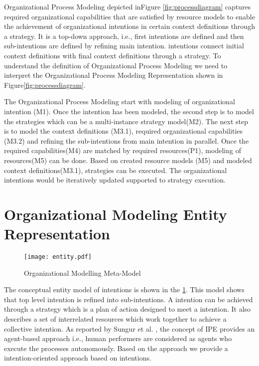 \hspace{4ex} Organizational Process Modeling depicted inFigure \ref{fig:processdiagram} captures required organizational capabilities that are satisfied by resource models  to enable the achievement of organizational intentions in certain context definitions through a strategy. It is a top-down approach, i.e., first intentions are defined and then sub-intentions  are defined by refining main intention. intentions connect initial context definitions with final context definitions through a strategy.  To understand the definition of Organizational Process Modeling we need to interpret the Organizational Process Modeling Representation shown in Figure\ref{fig:processdiagram}. 

\hspace{4ex} The Organizational Process Modeling start with modeling of organizational intention (M1). Once the intention has been modeled, the second step is to model the strategies which can be a multi-instance strategy model(M2). The next step is to model the context definitions (M3.1), required organizational capabilities (M3.2) and refining the sub-intentions from main intention in parallel. Once the required capabilities(M4) are matched by required resources(P1), modeling of resources(M5) can be done.  Based on created resource models (M5) and modeled context definitions(M3.1), strategies can be executed. The organizational intentions would be iteratively updated supported to strategy execution.  


\section{Organizational Modeling Entity Representation}

\begin{figure}
	\centering
	\texttt{[image: entity.pdf]}
	\caption{Organizational Modelling Meta-Model}
	\label{fig:metamodel}
\end{figure}

\hspace{4ex} The conceptual entity model of intentions is shown in the \ref{fig:metamodel}. This model shows that top level intention is refined into sub-intentions. A intention can be achieved through a strategy which is a plan of action designed to meet a intention. It also describes a set of interrelated resources which work together to achieve a collective intention. As reported by Sungur et al. \cite{Sungur2014a}, the concept of IPE provides an agent-based approach i.e., human performers are considered as agents who execute the processes autonomously. Based on the approach \cite{Sungur2014a} we provide a intention-oriented approach based on intentions.

